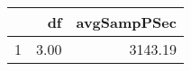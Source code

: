 \begin{table}[h]
\centering
\begin{tabular}{rrr}
  \hline
 & df & avgSampPSec \\ 
  \hline
1 & 3.00 & 3143.19 \\ 
   \hline
\end{tabular}
\end{table}
